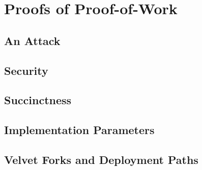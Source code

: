 \chapter{Proofs of Proof-of-Work}\label{chapter:work}
















\section{An Attack}
\section{Security}
\section{Succinctness}
\section{Implementation Parameters}
\section{Velvet Forks and Deployment Paths}
